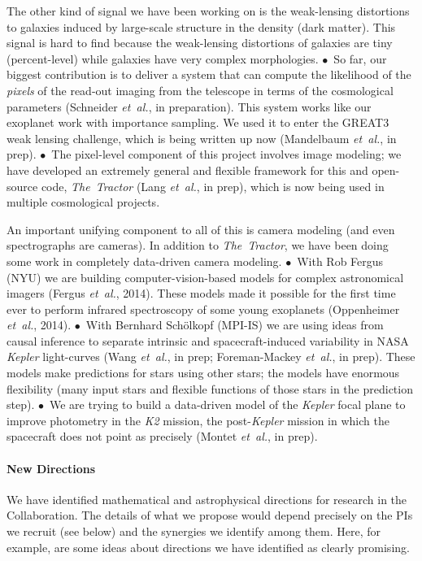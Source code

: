 \documentclass[12pt]{article}
\newcommand{\foreign}[1]{\textsl{#1}}
\newcommand{\etal}{\foreign{et~al.}}
\newcommand{\project}[1]{\textsl{#1}}
\newcommand{\hoggitem}{$\bullet$}
\begin{document}
The other kind of signal we have been working on is the weak-lensing
distortions to galaxies induced by large-scale structure in the
density (dark matter).
This signal is hard to find because the weak-lensing distortions of
galaxies are tiny (percent-level) while galaxies have very complex
morphologies.
\hoggitem~So far, our biggest contribution is to deliver a system that
can compute the likelihood of the \emph{pixels} of the read-out
imaging from the telescope in terms of the cosmological parameters
(Schneider \etal, in preparation).
This system works like our exoplanet work with importance sampling.
We used it to enter the GREAT3 weak lensing challenge, which is being
written up now (Mandelbaum \etal, in prep).
\hoggitem~The pixel-level component of this project involves image
modeling; we have developed an extremely general and flexible
framework for this and open-source code, \project{The~Tractor} (Lang
\etal, in prep), which is now being used in multiple cosmological
projects.

An important unifying component to all of this is camera modeling
(and even spectrographs are cameras).
In addition to \project{The~Tractor}, we have been doing some work in
completely data-driven camera modeling.
\hoggitem~With Rob Fergus (NYU) we are building computer-vision-based
models for complex astronomical imagers (Fergus \etal, 2014).
These models made it possible for the first time ever to perform
infrared spectroscopy of some young exoplanets (Oppenheimer \etal,
2014).
\hoggitem~With Bernhard Sch\"olkopf (MPI-IS) we are using ideas from
causal inference to separate intrinsic and spacecraft-induced
variability in NASA \project{Kepler} light-curves (Wang \etal, in
prep; Foreman-Mackey \etal, in prep).
These models make predictions for stars using other stars; the models
have enormous flexibility (many input stars and flexible functions of
those stars in the prediction step).
\hoggitem~We are trying to build a data-driven model of the
\project{Kepler} focal plane to improve photometry in the \project{K2}
mission, the post-\project{Kepler} mission in which the spacecraft
does not point as precisely (Montet \etal, in prep).

\paragraph{New Directions}

We have identified mathematical and astrophysical directions for
research in the Collaboration.
The details of what we propose would depend precisely on the PIs we
recruit (see below) and the synergies we identify among them.
Here, for example, are some ideas about directions we have identified
as clearly promising.
\end{document}
